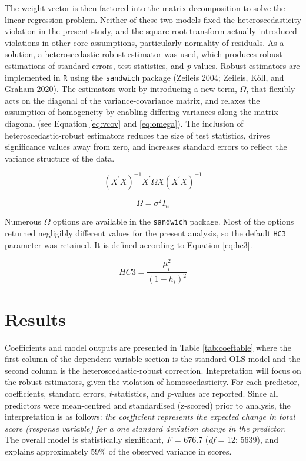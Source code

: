 \documentclass{article}
\begin{document}
The weight vector is then factored into the matrix decomposition to solve the linear regression problem. Neither of these two models fixed the heteroscedasticity violation in the present study, and the square root transform actually introduced violations in other core assumptions, particularly normality of residuals. As a solution, a heteroscedastic-robust estimator was used, which produces robust estimations of standard errors, test statistics, and \emph{p}-values. Robust estimators are implemented in \texttt{R} using the \texttt{sandwich} package (Zeileis 2004; Zeileis, Köll, and Graham 2020). The estimators work by introducing a new term, \(\Omega\), that flexibly acts on the diagonal of the variance-covariance matrix, and relaxes the assumption of homogeneity by enabling differing variances along the matrix diagonal (see Equation \eqref{eq:vcov} and \eqref{eq:omega}). The inclusion of heteroscedastic-robust estimators reduces the size of test statistics, drives significance values away from zero, and increases standard errors to reflect the variance structure of the data.

\begin{equation}
(X^{'}X)^{-1}X^{'}\Omega X (X^{'}X)^{-1} \label{eq:vcov}
\end{equation}

\begin{equation}
\Omega = \sigma^{2}I_{n} \label{eq:omega}
\end{equation}

Numerous \(\Omega\) options are available in the \texttt{sandwich} package. Most of the options returned negligibly different values for the present analysis, so the default \texttt{HC3} parameter was retained. It is defined according to Equation \eqref{eq:hc3}.

\begin{equation}
HC3 = \frac{\mu^{2}_{\hat{i}}}{(1-h_{i})^{2}} \label{eq:hc3}
\end{equation}

\hypertarget{results}{%
\section{Results}\label{results}}

Coefficients and model outputs are presented in Table \ref{tab:coeftable} where the first column of the dependent variable section is the standard OLS model and the second column is the heteroscedastic-robust correction. Intepretation will focus on the robust estimators, given the violation of homoscedasticity. For each predictor, coefficients, standard errors, \emph{t}-statistics, and \emph{p}-values are reported. Since all predictors were mean-centred and standardised (z-scored) prior to analysis, the interpretation is as follows: \emph{the coefficient represents the expected change in total score (response variable) for a one standard deviation change in the predictor}. The overall model is statistically significant, \emph{F} = 676.7 (\emph{df} = 12; 5639), and explains approximately 59\% of the observed variance in scores.
\end{document}
